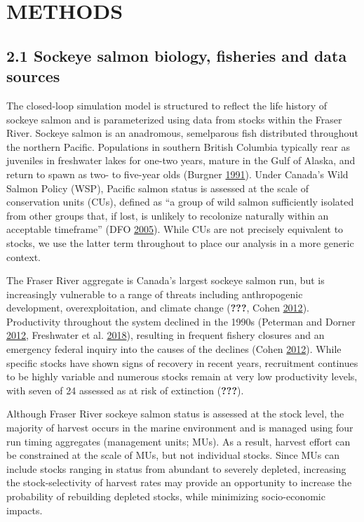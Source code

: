 \documentclass[11pt]{book}
\begin{document}
\section{METHODS}\label{methods}

\subsection{2.1 Sockeye salmon biology, fisheries and data sources}\label{sockeye-salmon-biology-fisheries-and-data-sources}

The closed-loop simulation model is structured to reflect the life history of sockeye salmon and is parameterized using data from stocks within the Fraser River. Sockeye salmon is an anadromous, semelparous fish distributed throughout the northern Pacific. Populations in southern British Columbia typically rear as juveniles in freshwater lakes for one-two years, mature in the Gulf of Alaska, and return to spawn as two- to five-year olds (Burgner \protect\hyperlink{ref-Burgner1991}{1991}). Under Canada's Wild Salmon Policy (WSP), Pacific salmon status is assessed at the scale of conservation units (CUs), defined as ``a group of wild salmon sufficiently isolated from other groups that, if lost, is unlikely to recolonize naturally within an acceptable timeframe'' (DFO \protect\hyperlink{ref-DFO2005}{2005}). While CUs are not precisely equivalent to stocks, we use the latter term throughout to place our analysis in a more generic context.

The Fraser River aggregate is Canada's largest sockeye salmon run, but is increasingly vulnerable to a range of threats including anthropogenic development, overexploitation, and climate change ({\textbf{???}}, Cohen \protect\hyperlink{ref-Cohen2012}{2012}). Productivity throughout the system declined in the 1990s (Peterman and Dorner \protect\hyperlink{ref-Peterman2012}{2012}, Freshwater et al. \protect\hyperlink{ref-Freshwater2018}{2018}), resulting in frequent fishery closures and an emergency federal inquiry into the causes of the declines (Cohen \protect\hyperlink{ref-Cohen2012}{2012}). While specific stocks have shown signs of recovery in recent years, recruitment continues to be highly variable and numerous stocks remain at very low productivity levels, with seven of 24 assessed as at risk of extinction ({\textbf{???}}).

Although Fraser River sockeye salmon status is assessed at the stock level, the majority of harvest occurs in the marine environment and is managed using four run timing aggregates (management units; MUs). As a result, harvest effort can be constrained at the scale of MUs, but not individual stocks. Since MUs can include stocks ranging in status from abundant to severely depleted, increasing the stock-selectivity of harvest rates may provide an opportunity to increase the probability of rebuilding depleted stocks, while minimizing socio-economic impacts.
\end{document}
